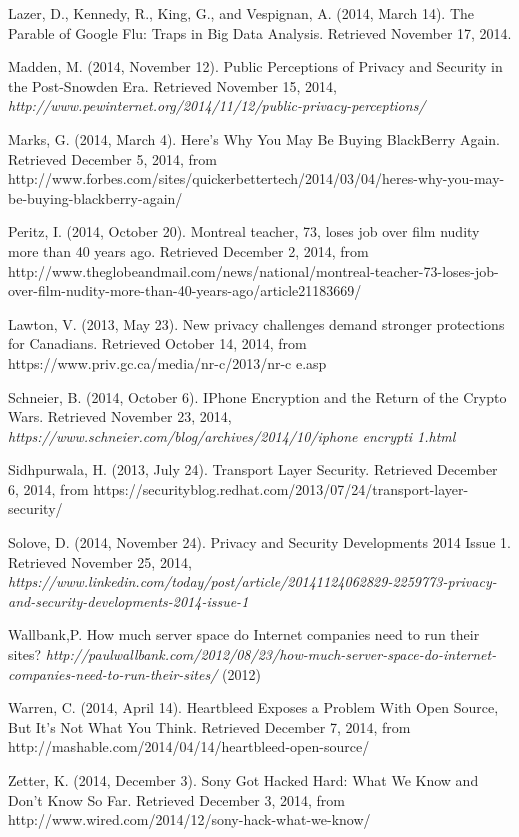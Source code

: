 \documentclass[12pt]{article}
\begin{document}
\begin{thebibliography}{99}
	Lazer, D., Kennedy, R., King, G., and Vespignan, A. (2014, March 14). The Parable of Google Flu: Traps in Big Data Analysis. Retrieved November 17, 2014.

	Madden, M. (2014, November 12). Public Perceptions of Privacy and Security in the Post-Snowden Era. Retrieved November 15, 2014, {\sl http://www.pewinternet.org/2014/11/12/public-privacy-perceptions/}

	Marks, G. (2014, March 4). Here's Why You May Be Buying BlackBerry Again. Retrieved December 5, 2014, from http://www.forbes.com/sites/quickerbettertech/2014/03/04/heres-why-you-may-be-buying-blackberry-again/

	Peritz, I. (2014, October 20). Montreal teacher, 73, loses job over film nudity more than 40 years ago. Retrieved December 2, 2014, from http://www.theglobeandmail.com/news/national/montreal-teacher-73-loses-job-over-film-nudity-more-than-40-years-ago/article21183669/

	Lawton, V. (2013, May 23). New privacy challenges demand stronger protections for Canadians. Retrieved October 14, 2014, from https://www.priv.gc.ca/media/nr-c/2013/nr-c \textunderscore e.asp

	Schneier, B. (2014, October 6). IPhone Encryption and the Return of the Crypto Wars. Retrieved November 23, 2014, {\sl https://www.schneier.com/blog/archives/2014/10/iphone \textunderscore encrypti \textunderscore 1.html}

	Sidhpurwala, H. (2013, July 24). Transport Layer Security. Retrieved December 6, 2014, from https://securityblog.redhat.com/2013/07/24/transport-layer-security/

	Solove, D. (2014, November 24). Privacy and Security Developments 2014 Issue 1. Retrieved November 25, 2014, {\sl https://www.linkedin.com/today/post/article/20141124062829-2259773-privacy-and-security-developments-2014-issue-1}

	Wallbank,P. How much server space do Internet companies need to run their sites? {\sl http://paulwallbank.com/2012/08/23/how-much-server-space-do-internet-companies-need-to-run-their-sites/} (2012)

	Warren, C. (2014, April 14). Heartbleed Exposes a Problem With Open Source, But It's Not What You Think. Retrieved December 7, 2014, from http://mashable.com/2014/04/14/heartbleed-open-source/

	Zetter, K. (2014, December 3). Sony Got Hacked Hard: What We Know and Don’t Know So Far. Retrieved December 3, 2014, from http://www.wired.com/2014/12/sony-hack-what-we-know/

\end{thebibliography}
\end{document}
